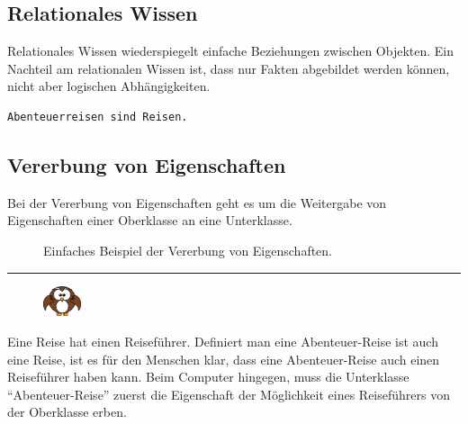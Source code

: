 \subsection{Relationales Wissen}
\label{subsec:relationales_wissen}
Relationales Wissen wiederspiegelt einfache Beziehungen zwischen Objekten. Ein Nachteil am relationalen Wissen ist, dass nur Fakten abgebildet werden können, nicht aber logischen Abhängigkeiten.

\begin{lstlisting}[caption={Einfaches Beispiel von relationalem Wissen.}]
     Abenteuerreisen sind Reisen.
\end{lstlisting}

\newpage

\subsection{Vererbung von Eigenschaften}
\label{subsec:vererbung_eigenschaft}
Bei der Vererbung von Eigenschaften geht es um die Weitergabe von Eigenschaften einer Oberklasse an eine Unterklasse.

\begin{figure}[htbp]
\centering {}
\caption{Einfaches Beispiel der Vererbung von Eigenschaften.\label{fig:experten_systeme_vererbung}\protect\footnotemark}
\end{figure}


\noindent\rule[1ex]{\textwidth}{1pt}
\begin{figure}
    \vspace{-14pt}
    \includegraphics[width=0.1\textwidth]{bilder/owl.png}
\end{figure}
Eine Reise hat einen Reiseführer. Definiert man eine Abenteuer-Reise ist auch eine Reise, ist es für den Menschen klar, dass eine Abenteuer-Reise auch einen Reiseführer haben kann. Beim Computer hingegen, muss die Unterklasse ``Abenteuer-Reise'' zuerst die Eigenschaft der Möglichkeit eines Reiseführers von der Oberklasse erben.\\

